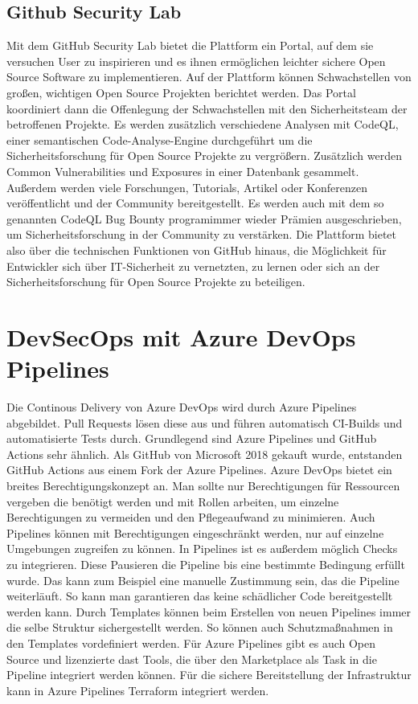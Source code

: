 \section{Github Security Lab}
Mit dem GitHub Security Lab bietet die Plattform ein Portal, auf dem sie versuchen User zu inspirieren und es ihnen ermöglichen leichter sichere Open Source Software zu implementieren. 
Auf der Plattform können Schwachstellen von großen, wichtigen Open Source Projekten berichtet werden. Das Portal koordiniert dann die Offenlegung der Schwachstellen mit den Sicherheitsteam der betroffenen Projekte. Es werden zusätzlich verschiedene Analysen mit CodeQL, einer semantischen Code-Analyse-Engine durchgeführt um die Sicherheitsforschung für Open Source Projekte zu vergrößern. Zusätzlich werden Common Vulnerabilities und Exposures in einer Datenbank gesammelt.
Außerdem werden viele Forschungen, Tutorials, Artikel oder Konferenzen veröffentlicht und der Community bereitgestellt.
Es werden auch mit dem so genannten \glqq CodeQL Bug Bounty program\grqq immer wieder Prämien ausgeschrieben, um Sicherheitsforschung in der Community zu verstärken. Die Plattform bietet also über die technischen Funktionen von GitHub hinaus, die Möglichkeit für Entwickler sich über IT-Sicherheit zu vernetzten, zu lernen oder sich an der Sicherheitsforschung für Open Source Projekte zu beteiligen. \cite{github-securitylab}

\chapter{DevSecOps mit Azure DevOps Pipelines}

Die Continous Delivery von Azure DevOps wird durch Azure Pipelines abgebildet. Pull Requests lösen diese aus und führen automatisch CI-Builds und automatisierte Tests durch. Grundlegend sind Azure Pipelines und GitHub Actions sehr ähnlich. Als GitHub von Microsoft 2018 gekauft wurde, entstanden GitHub Actions aus einem Fork der Azure Pipelines. \cite{mic-actions-pipelines} 
Azure DevOps bietet ein breites Berechtigungskonzept an. Man sollte nur Berechtigungen für Ressourcen vergeben die benötigt werden und mit Rollen arbeiten, um einzelne Berechtigungen zu vermeiden und den Pflegeaufwand zu minimieren. Auch Pipelines können mit Berechtigungen eingeschränkt werden, nur auf einzelne Umgebungen zugreifen zu können.
In Pipelines ist es außerdem möglich Checks zu integrieren. Diese Pausieren die Pipeline bis eine bestimmte Bedingung erfüllt wurde. Das kann zum Beispiel eine manuelle Zustimmung sein, das die Pipeline weiterläuft. So kann man garantieren das keine schädlicher Code bereitgestellt werden kann. \cite{mic-ressouce-protection} Durch Templates können beim Erstellen von neuen Pipelines immer die selbe Struktur sichergestellt werden. So können auch Schutzmaßnahmen in den Templates vordefiniert werden. \cite{mic-templates}
Für Azure Pipelines gibt es auch Open Source und lizenzierte \ac{dast} Tools, die über den Marketplace als Task in die Pipeline integriert werden können.
Für die sichere Bereitstellung der Infrastruktur kann in Azure Pipelines Terraform integriert werden. \cite{EdPrice-MSFT_undated-bx}

